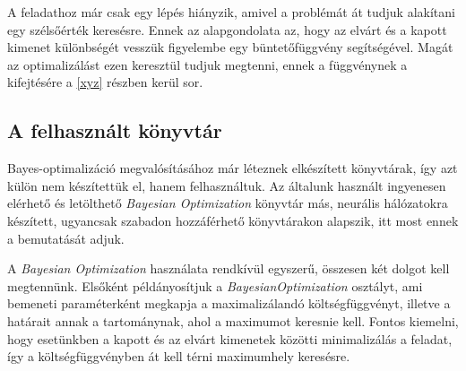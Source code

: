 		A feladathoz már csak egy lépés hiányzik, amivel a problémát át tudjuk alakítani egy szélsőérték keresésre. Ennek az alapgondolata az, hogy az elvárt és a kapott kimenet különbségét vesszük figyelembe egy büntetőfüggvény segítségével. Magát az optimalizálást ezen keresztül tudjuk megtenni, ennek a függvénynek a kifejtésére a \ref{xyz} részben kerül sor.
		
	\subsection{A felhasznált könyvtár}
	
		Bayes-optimalizáció megvalósításához már léteznek elkészített könyvtárak, így azt külön nem készítettük el, hanem felhasználtuk. Az általunk használt ingyenesen elérhető és letölthető \textit{Bayesian Optimization} könyvtár más, neurális hálózatokra készített, ugyancsak szabadon hozzáférhető könyvtárakon alapszik, itt most ennek a bemutatását adjuk.
		
		A \textit{Bayesian Optimization} használata rendkívül egyszerű, összesen két dolgot kell megtennünk. Elsőként példányosítjuk a \textit{BayesianOptimization} osztályt, ami bemeneti paraméterként megkapja a maximalizálandó költségfüggvényt, illetve a határait annak a tartománynak, ahol a maximumot keresnie kell. Fontos kiemelni, hogy esetünkben a kapott és az elvárt kimenetek közötti minimalizálás a feladat, így a költségfüggvényben át kell térni maximumhely keresésre. 
		
